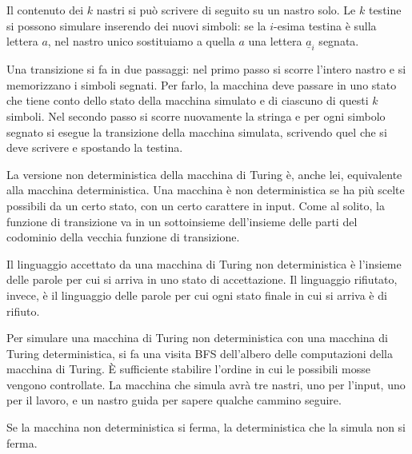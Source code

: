 Il contenuto dei $k$ nastri si pu\`o scrivere di seguito su un nastro solo.
Le $k$ testine si possono simulare inserendo dei nuovi simboli: se la $i$-esima testina \`e sulla lettera $a$, nel nastro unico sostituiamo a quella $a$ una lettera $\underline{a}_i$ segnata.

Una transizione si fa in due passaggi: nel primo passo si scorre l'intero nastro e si memorizzano i simboli segnati.
Per farlo, la macchina deve passare in uno stato che tiene conto dello stato della macchina simulato e di ciascuno di questi $k$ simboli.
Nel secondo passo si scorre nuovamente la stringa e per ogni simbolo segnato si esegue la transizione della macchina simulata, scrivendo quel che si deve scrivere e spostando la testina.

La versione non deterministica della macchina di Turing \`e, anche lei, equivalente alla macchina deterministica.
Una macchina \`e non deterministica se ha pi\`u scelte possibili da un certo stato, con un certo carattere in input.
Come al solito, la funzione di transizione va in un sottoinsieme dell'insieme delle parti del codominio della vecchia funzione di transizione.

Il linguaggio accettato da una macchina di Turing non deterministica \`e l'insieme delle parole per cui si arriva in uno stato di accettazione.
Il linguaggio rifiutato, invece, \`e il linguaggio delle parole per cui ogni stato finale in cui si arriva \`e di rifiuto.

Per simulare una macchina di Turing non deterministica con una macchina di Turing deterministica, si fa una visita BFS dell'albero delle computazioni della macchina di Turing.
\`E sufficiente stabilire l'ordine in cui le possibili mosse vengono controllate.
La macchina che simula avr\`a tre nastri, uno per l'input, uno per il lavoro, e un nastro guida per sapere qualche cammino seguire.

Se la macchina non deterministica si ferma, la deterministica che la simula non si ferma.

